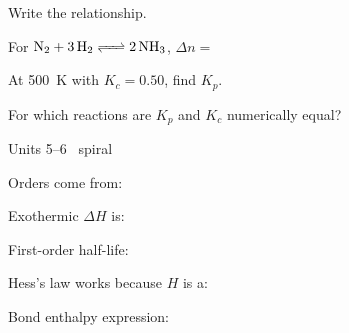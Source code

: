 \documentclass{apchem-worksheet}
\begin{document}
\begin{parts}
  \item Write the relationship. 
  \item For $\ce{N2 + 3H2 <=> 2NH3}$, $\Delta n = $
  \item At \SI{500}{\kelvin} with $K_c = 0.50$, find $K_p$.
        \workspace[2.2cm]
  \item For which reactions are $K_p$ and $K_c$ numerically equal?
\end{parts}

\begin{spiralstrip}{Units 5--6 \textbullet\ spiral}
  \item Orders come from: 
  \item Exothermic $\Delta H$ is: 
  \item First-order half-life: 
  \item Hess's law works because $H$ is a:
  \item Bond enthalpy expression: 
\end{spiralstrip}
\end{document}
